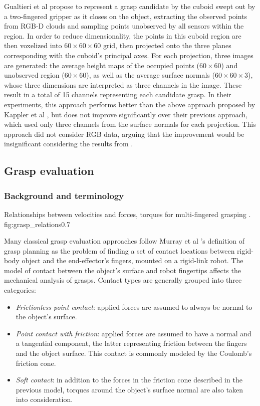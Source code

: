 Gualtieri et al \cite{Gualtieri2016} propose to represent a grasp candidate by the cuboid swept out by a two-fingered
gripper as it closes on the object, extracting the observed points from RGB-D clouds and sampling points unobserved by
all sensors within the region. In order to reduce dimensionality, the points in this cuboid region are then voxelized
into $60 \times 60 \times 60$ grid, then projected onto the three planes corresponding with the cuboid's principal axes.
For each projection, three images are generated: the average height maps of the occupied points ($60 \times 60$) and
unobserved region ($60 \times 60$), as well as the average surface normals ($60 \times 60 \times 3$), whose three
dimensions are interpreted as three channels in the image. These result in a total of 15 channels representing each
candidate grasp. In their experiments, this approach performs better than the above approach proposed by Kappler et al
\cite{Kappler2015}, but does not improve significantly over their previous approach, which used only three channels from
the surface normals for each projection. This approach did not consider RGB data, arguing that the improvement would be
insignificant considering the results from \cite{lenz2015}.

\subsection{Grasp evaluation}

\subsubsection*{Background and terminology}
{Relationships between velocities and forces, torques for multi-fingered grasping \cite{Roa2015}.}
{fig:grasp_relations}{0.7\textwidth}

Many classical grasp evaluation approaches follow Murray et al \cite{Murray1994}'s definition of grasp planning as the
problem of finding a set of contact locations between rigid-body object and the end-effector's fingers, mounted on a
rigid-link robot. The model of contact between the object's surface and robot fingertips affects the mechanical analysis
of grasps. Contact types are generally grouped into three categories:
\begin{itemize}
    \item \emph{Frictionless point contact}: applied forces are assumed to always be normal to the object's surface.
    \item \emph{Point contact with friction}: applied forces are assumed to have a normal and a tangential component,
    the latter representing friction between the fingers and the object surface. This contact is commonly modeled by
    the Coulomb's friction cone.
    \item \emph{Soft contact}: in addition to the forces in the friction cone described in the previous model, torques
    around the object's surface normal are also taken into consideration.
\end{itemize}

